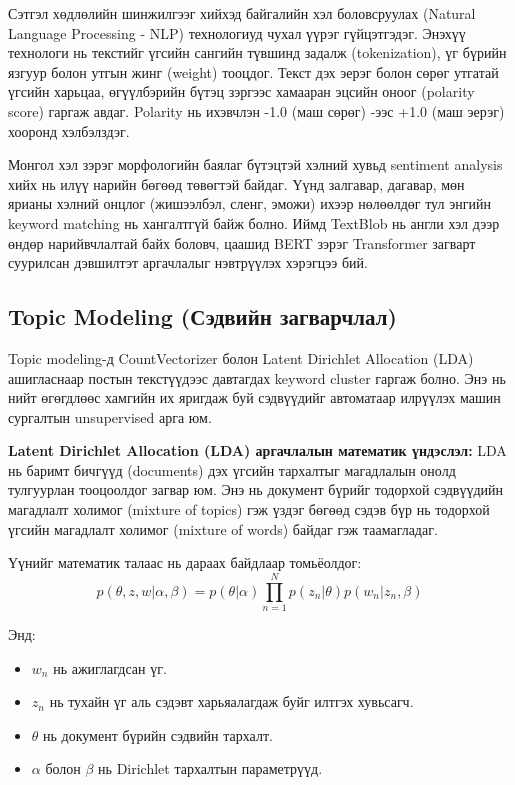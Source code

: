 Сэтгэл хөдлөлийн шинжилгээг хийхэд байгалийн хэл боловсруулах (Natural Language Processing - NLP) технологиуд чухал үүрэг гүйцэтгэдэг. Энэхүү технологи нь текстийг үгсийн сангийн түвшинд задалж (tokenization), үг бүрийн язгуур болон утгын жинг (weight) тооцдог. Текст дэх эерэг болон сөрөг утгатай үгсийн харьцаа, өгүүлбэрийн бүтэц зэргээс хамааран эцсийн оноог (polarity score) гаргаж авдаг. Polarity нь ихэвчлэн -1.0 (маш сөрөг) -ээс +1.0 (маш эерэг) хооронд хэлбэлздэг.

Монгол хэл зэрэг морфологийн баялаг бүтэцтэй хэлний хувьд sentiment analysis хийх нь илүү нарийн бөгөөд төвөгтэй байдаг. Үүнд залгавар, дагавар, мөн ярианы хэлний онцлог (жишээлбэл, сленг, эможи) ихээр нөлөөлдөг тул энгийн keyword matching нь хангалтгүй байж болно. Иймд TextBlob нь англи хэл дээр өндөр нарийвчлалтай байх боловч, цаашид BERT зэрэг Transformer загварт суурилсан дэвшилтэт аргачлалыг нэвтрүүлэх хэрэгцээ бий.

\subsection{Topic Modeling (Сэдвийн загварчлал)}
Topic modeling-д CountVectorizer болон Latent Dirichlet Allocation (LDA) ашигласнаар постын текстүүдээс давтагдах keyword cluster гаргаж болно. Энэ нь нийт өгөгдлөөс хамгийн их яригдаж буй сэдвүүдийг автоматаар илрүүлэх машин сургалтын unsupervised арга юм.

\textbf{Latent Dirichlet Allocation (LDA) аргачлалын математик үндэслэл:}
LDA нь баримт бичгүүд (documents) дэх үгсийн тархалтыг магадлалын онолд тулгуурлан тооцоолдог загвар юм. Энэ нь документ бүрийг тодорхой сэдвүүдийн магадлалт холимог (mixture of topics) гэж үздэг бөгөөд сэдэв бүр нь тодорхой үгсийн магадлалт холимог (mixture of words) байдаг гэж таамагладаг.

Үүнийг математик талаас нь дараах байдлаар томьёолдог:
$$ p(\theta, z, w | \alpha, \beta) = p(\theta | \alpha) \prod_{n=1}^{N} p(z_n | \theta) p(w_n | z_n, \beta) $$

Энд:
\begin{itemize}
    \item $w_n$ нь ажиглагдсан үг.
    \item $z_n$ нь тухайн үг аль сэдэвт харьяалагдаж буйг илтгэх хувьсагч.
    \item $\theta$ нь документ бүрийн сэдвийн тархалт.
    \item $\alpha$ болон $\beta$ нь Dirichlet тархалтын параметрүүд.
\end{itemize}

